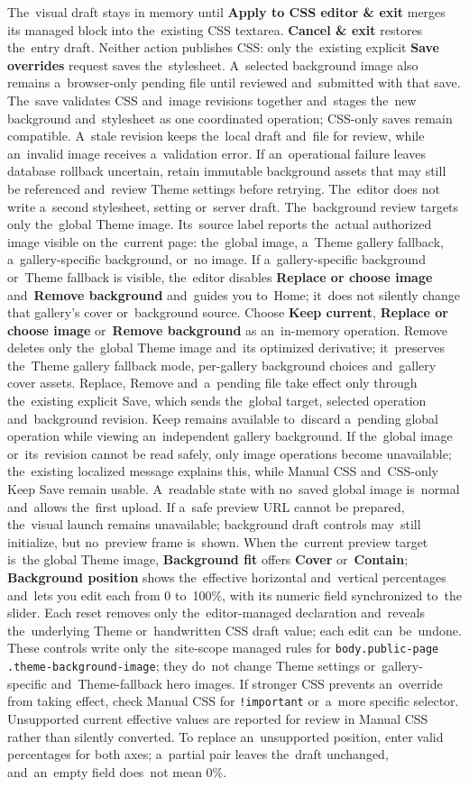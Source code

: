 \documentclass[11pt,a4paper]{article}
\newcommand{\ui}[1]{\textbf{#1}}
\newcommand{\codeword}[1]{\nolinkurl{#1}}
\begin{document}
The~visual draft stays in memory until \ui{Apply to CSS editor \& exit} merges
its managed block into the~existing CSS textarea. \ui{Cancel \& exit} restores
the~entry draft. Neither action publishes CSS: only the~existing explicit
\ui{Save overrides} request saves the~stylesheet. A~selected background image
also remains a~browser-only pending file until reviewed and~submitted with that
save. The~save validates CSS and~image revisions together and~stages the~new
background and~stylesheet as one coordinated operation; CSS-only saves remain
compatible. A~stale revision keeps the~local draft and~file for review, while
an~invalid image receives a~validation error. If an~operational failure leaves
database rollback uncertain, retain immutable background assets that may still
be referenced and~review Theme settings before retrying. The~editor does not
write a~second stylesheet, setting or~server draft.
The~background review targets only the~global Theme image. Its~source label
reports the~actual authorized image visible on the~current page: the~global
image, a~Theme gallery fallback, a~gallery-specific background, or~no image. If
a~gallery-specific background or~Theme fallback is visible, the~editor disables
\ui{Replace or choose image} and~\ui{Remove background} and~guides you to~Home;
it~does not silently change that gallery's cover or~background source. Choose
\ui{Keep current}, \ui{Replace or choose image} or~\ui{Remove background} as
an~in-memory operation. Remove deletes only the~global Theme image and~its
optimized derivative; it~preserves the~Theme gallery fallback mode, per-gallery
background choices and~gallery cover assets. Replace, Remove and~a~pending file
take effect only through the~existing explicit Save, which sends the~global
target, selected operation and~background revision. Keep remains available
to~discard a~pending global operation while viewing an~independent gallery
background.
If the~global image or~its~revision cannot be read safely, only image operations
become unavailable; the~existing localized message explains this, while Manual
CSS and~CSS-only Keep Save remain usable. A~readable state with no~saved global
image is~normal and~allows the~first upload. If a~safe preview URL cannot be
prepared, the~visual launch remains unavailable; background draft controls
may~still initialize, but no~preview frame is~shown.
When the~current preview target is~the global Theme image, \ui{Background fit}
offers \ui{Cover} or~\ui{Contain}; \ui{Background position} shows the~effective
horizontal and~vertical percentages and~lets you edit each from 0 to~100\%, with
its numeric field synchronized to~the slider. Each reset removes only
the~editor-managed declaration and~reveals the~underlying Theme or~handwritten
CSS draft value; each edit can~be~undone. These controls write only
the~site-scope managed rules for
\codeword{body.public-page .theme-background-image}; they do~not change Theme
settings or~gallery-specific and~Theme-fallback hero images. If stronger CSS
prevents an~override from taking effect, check Manual CSS for
\codeword{!important} or~a~more specific selector. Unsupported current effective
values are reported for review in Manual CSS rather than silently converted. To
replace an~unsupported position, enter valid percentages for both axes;
a~partial pair leaves the~draft unchanged, and~an~empty field does~not mean 0\%.
\end{document}
